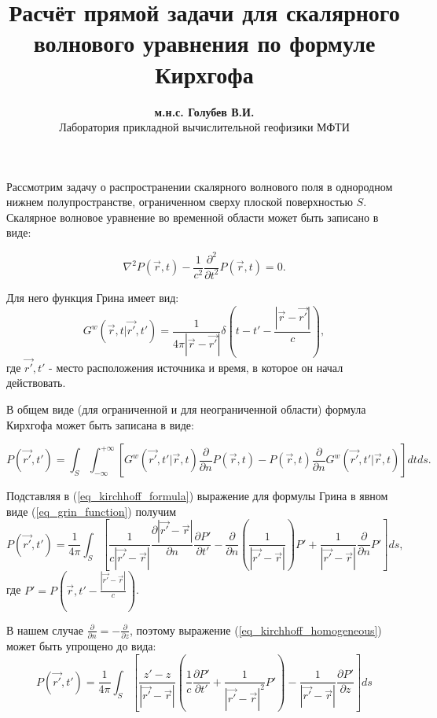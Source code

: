 \documentclass{article}
\begin{document}
\title{Расчёт прямой задачи для скалярного волнового уравнения по формуле Кирхгофа}
\author{\textbf{м.н.с. Голубев В.И.} \\ Лаборатория прикладной вычислительной геофизики МФТИ}
\maketitle
Рассмотрим задачу о распространении скалярного волнового поля в однородном нижнем полупространстве,
ограниченном сверху плоской поверхностью $S$.
Скалярное волновое уравнение во временной области может быть записано в виде:

\begin{equation}
\label{eq_wave_equation}
\nabla^2 P(\vec{r}, t) - \frac{1}{c^2}\frac{\partial^2}{\partial t^2}P(\vec{r}, t) = 0.
\end{equation}

Для него функция Грина имеет вид:
\begin{equation}
\label{eq_grin_function}
G^w(\vec{r}, t | \vec{r'}, t') = \frac{1}{4\pi|\vec{r} - \vec{r'}|}\delta(t - t' - \frac{|\vec{r} -
\vec{r'}|}{c}),
\end{equation}
где $\vec{r'}, t'$ - место расположения источника и время, в которое он начал действовать.

В общем виде (для ограниченной и для неограниченной области) формула Кирхгофа может быть записана
в виде:

\begin{equation}
\label{eq_kirchhoff_formula}
P(\vec{r'}, t') = \int_S \int_{-\infty}^{+\infty} [G^w(\vec{r'}, t' | \vec{r}, t) \frac{\partial}
{\partial n} P(\vec{r}, t) - P(\vec{r}, t) \frac{\partial}{\partial n} G^w(\vec{r'}, t' |
\vec{r}, t)] dt ds.
\end{equation}

Подставляя в (\ref{eq_kirchhoff_formula}) выражение для формулы Грина в явном виде (\ref{eq_grin_function}) получим
\begin{equation}
\label{eq_kirchhoff_homogeneous}
P(\vec{r'}, t') = \frac{1}{4\pi} \int_S [\frac{1}{c|\vec{r'} - \vec{r}|}
\frac{\partial |\vec{r'} - \vec{r}|}{\partial n}\frac{\partial P'}{\partial t'}
- \frac{\partial}{\partial n}(\frac{1}{|\vec{r'} - \vec{r}|}) P' + 
\frac{1}{|\vec{r'} - \vec{r}|}\frac{\partial}{\partial n}P'] ds,
\end{equation}
где $P' = P(\vec{r}, t' - \frac{|\vec{r'} - \vec{r}|}{c})$.

В нашем случае $\frac{\partial}{\partial n} = -\frac{\partial}{\partial z}$, поэтому выражение
(\ref{eq_kirchhoff_homogeneous}) может быть упрощено до вида:
\begin{equation}
\label{eq_kirchhoff_final}
P(\vec{r'}, t') = \frac{1}{4\pi} \int_S [\frac{z' - z}{|\vec{r'} - \vec{r}|}(\frac{1}{c}
\frac{\partial P'}{\partial t'} + \frac{1}{|\vec{r'} - \vec{r}|^2} P') - \frac{1}{|\vec{r'}
- \vec{r}|}\frac{\partial P'}{\partial z}] ds
\end{equation}
\end{document}

